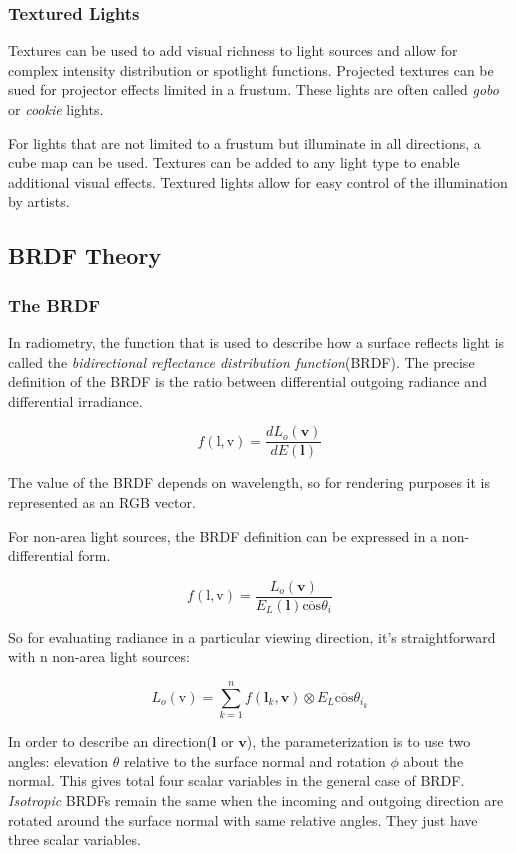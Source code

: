 \documentclass[10pt, a4paper]{article}
\begin{document}
        \subsubsection{Textured Lights}
            Textures can be used to add  visual richness to light sources and allow for complex intensity distribution or spotlight functions. Projected textures can be sued for projector effects limited in a frustum. These lights are often called \emph{gobo} or \emph{cookie} lights.  
            
            For lights that are not limited to a frustum but illuminate in all directions, a cube map can be used. Textures can be added to any light type to enable additional visual effects. Textured lights allow for easy control of the illumination by artists. 
    \subsection{BRDF Theory}
        \subsubsection{The BRDF}
            In radiometry, the function that is used to describe how a surface reflects light is called the \emph{bidirectional reflectance distribution function}(BRDF).  The precise definition of the BRDF is the ratio between differential outgoing radiance and differential irradiance. 

            $$f(\text{l}, \text{v}) = \frac{dL_o(\textbf{v})}{dE(\textbf{l})}$$

            The value of the BRDF depends on wavelength, so for rendering purposes it is represented as an RGB vector. 

            For non-area light sources, the BRDF definition can be expressed in a non-differential form. 

            $$f(\text{l}, \text{v}) = \frac{L_o(\textbf{v})}{E_L(\textbf{l})\overline{\text{cos}}\theta_i}$$

            So for evaluating radiance in a particular viewing direction, it's straightforward with n non-area light sources: 

            $$L_o(\text{v}) = \sum_{k = 1}^{n}f(\textbf{l}_k, \textbf{v}) \otimes E_L\overline{\text{cos}}\theta_{i_k}$$

            In order to describe an direction($\textbf{l}$ or $\textbf{v}$), the parameterization is to use two angles: elevation $\theta$ relative to the surface normal and rotation $\phi$ about the normal. This gives total four scalar variables in the general case of BRDF. \emph{Isotropic} BRDFs remain the same when the incoming and outgoing direction are rotated around the surface normal with same relative angles. They just have three scalar variables. 
\end{document}
